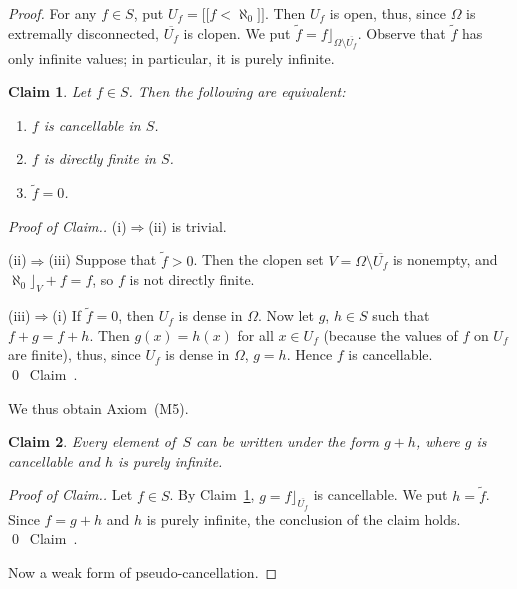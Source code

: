 \documentclass[psamsfonts,reqno]{memo-l}
\theoremstyle{plain}
\newtheorem{claim}{Claim}
\theoremstyle{definition}
\theoremstyle{remark}
\newcommand{\qedc}{{\qed}~{\rm Claim~{\theclaim}.}}
\newenvironment{cproof}
{\begin{proof}[Proof of Claim.]}
{\qedc\renewcommand{\qed}{}\end{proof}}
\numberwithin{equation}{section}
\newcommand{\oll}[1]{\overline{#1}}
\newcommand{\vbv}[1]{{[\![}#1{]\!]}}
\begin{document}
\begin{proof}
For any $f\in S$, put $U_f=\vbv{f<\aleph_0}$. Then $U_f$ is
open, thus, since $\Omega$ is extremally disconnected, $\oll{U_f}$ is
clopen. We put $\widetilde{f}=f\rfloor_{\Omega\setminus\oll{U_f}}$.
Observe that $\widetilde{f}$ has only infinite values; in particular, it is
purely infinite.

\setcounter{claim}{0}
\begin{claim}\label{Cl:CancDf}\label{Cl:CanDfT}
Let $f\in S$. Then the following are equivalent:
\begin{enumerate}
\item $f$ is cancellable in $S$.

\item $f$ is directly finite in $S$.

\item $\widetilde{f}=0$.
\end{enumerate}
\end{claim}

\begin{cproof}
(i)$\Rightarrow$(ii) is trivial.

(ii)$\Rightarrow$(iii) Suppose that $\widetilde{f}>0$. Then the clopen set
$V=\Omega\setminus\oll{U_f}$ is nonempty, and $\aleph_0\rfloor_V+f=f$, so
$f$ is not directly finite.

(iii)$\Rightarrow$(i) If $\widetilde{f}=0$, then $U_f$ is dense
in $\Omega$. Now let $g$, $h\in S$ such that $f+g=f+h$. Then $g(x)=h(x)$ for
all $x\in U_f$ (because the values of $f$ on $U_f$ are finite), thus, since
$U_f$ is dense in $\Omega$, $g=h$. Hence $f$ is
cancellable.
\end{cproof}

We thus obtain Axiom~(M5).

\begin{claim}\label{Cl:pi+df}
Every element of~$S$ can be written under the form $g+h$, where $g$ is
cancellable and $h$ is purely infinite.
\end{claim}

\begin{cproof}
Let $f\in S$. By Claim~\ref{Cl:CancDf}, $g=f\rfloor_{\oll{U_f}}$
is cancellable. We put $h=\widetilde{f}$. Since
$f=g+h$ and $h$ is purely infinite, the conclusion of the claim holds.
\end{cproof}

Now a weak form of pseudo-cancellation.


\end{proof}
\end{document}
